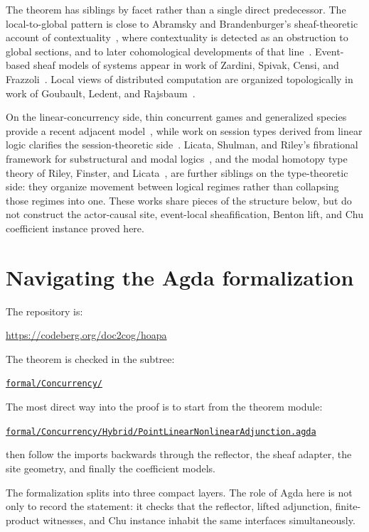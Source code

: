 \documentclass[11pt]{article}
\newcommand{\RepoURL}{https://codeberg.org/doc2cog/hoapa/src/branch/main}
\newcommand{\RepoDir}[1]{\href{\RepoURL/#1}{\nolinkurl{#1/}}}
\newcommand{\RepoFile}[1]{\href{\RepoURL/#1}{\nolinkurl{#1}}}
\begin{document}
The theorem has siblings by facet rather than a single direct predecessor. The
local-to-global pattern is close to Abramsky and Brandenburger's
sheaf-theoretic account of contextuality~\cite{AbramskyBrandenburger2011},
where contextuality is detected as an obstruction to global sections, and to
later cohomological developments of that line~\cite{AbramskyEtAl2015}.
Event-based sheaf models of systems appear in work of Zardini, Spivak, Censi,
and Frazzoli~\cite{ZardiniEtAl2021}. Local views of distributed computation are
organized topologically in work of Goubault, Ledent, and
Rajsbaum~\cite{GoubaultLedentRajsbaum2018}.

On the linear-concurrency side, thin concurrent games and generalized species
provide a recent adjacent model~\cite{ClairambaultOlimpieriPaquet2023}, while
work on session types derived from linear logic clarifies the session-theoretic
side~\cite{Wadler2014,VanDenHeuvelPerez2024}. Licata, Shulman, and Riley's
fibrational framework for substructural and modal logics~\cite{LSR2017}, and
the modal homotopy type theory of Riley, Finster, and
Licata~\cite{RileyFinsterLicata2021}, are further siblings on the
type-theoretic side: they organize movement between logical regimes rather than
collapsing those regimes into one. These works share pieces of the structure
below, but do not construct the actor-causal site, event-local sheafification,
Benton lift, and Chu coefficient instance proved here.

\section*{Navigating the Agda formalization}

The repository is:
\begin{center}
\url{https://codeberg.org/doc2cog/hoapa}
\end{center}
The theorem is checked in the subtree:
\begin{center}
\RepoDir{formal/Concurrency}
\end{center}
The most direct way into the proof is to start from the theorem module:
\begin{center}
\RepoFile{formal/Concurrency/Hybrid/PointLinearNonlinearAdjunction.agda}
\end{center}
then follow the imports backwards through the reflector, the sheaf adapter, the
site geometry, and finally the coefficient models.

The formalization splits into three compact layers. The role of Agda here is
not only to record the statement: it checks that the reflector, lifted
adjunction, finite-product witnesses, and Chu instance inhabit the same
interfaces simultaneously.
\end{document}
